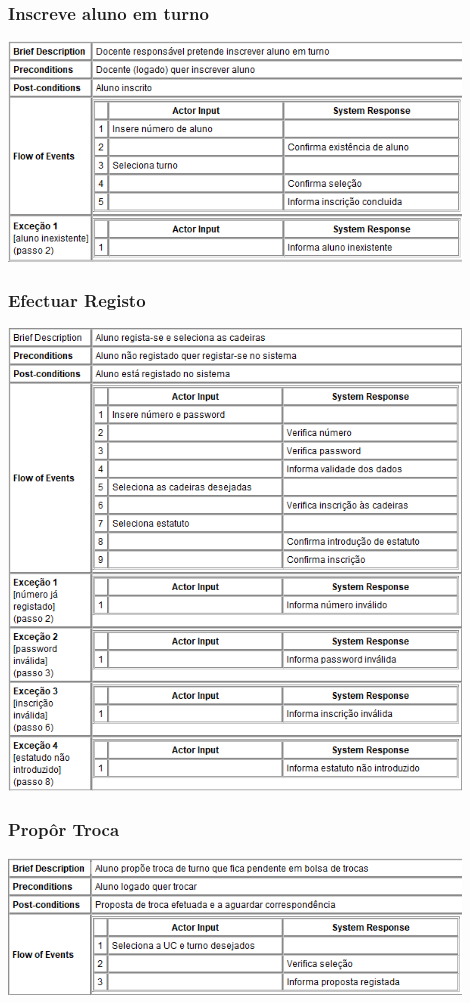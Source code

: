 \documentclass[a4paper]{article}
\begin{document}
\subsubsection{Inscreve aluno em turno}
\includegraphics[width=12cm]{inscreveralunoturno}\break

\subsubsection{Efectuar Registo}
\includegraphics[width=12cm]{efectuarregisto}\break

\subsubsection{Propôr Troca}
\includegraphics[width=12cm]{proportroca}\break
\end{document}
